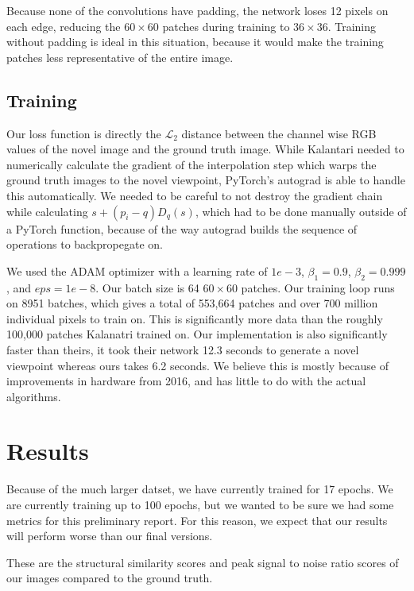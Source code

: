 \documentclass[10pt,twocolumn,letterpaper]{article}
\begin{document}
Because none of the convolutions have padding, the network loses 12 pixels on each edge, reducing
the $60 \times 60$ patches during training to $36 \times 36$. Training without padding is ideal in this situation, 
because it would make the training patches less representative of the entire image.

\subsection{Training}

Our loss function is directly the $\mathcal{L}_2$ distance between the channel wise RGB values of the novel image
and the ground truth image. While Kalantari \etal needed to numerically calculate the gradient of the interpolation
step which warps the ground truth images to the novel viewpoint, PyTorch's autograd is able to handle this automatically.
We needed to be careful to not destroy the gradient chain while calculating $s + \left(p_i - q\right) D_q(s)$, which had
to be done manually outside of a PyTorch function, because of the way autograd builds the sequence of operations to backpropegate on.

We used the ADAM optimizer with a learning rate of $1e-3$, $\beta_1 = 0.9$, $\beta_2 = 0.999$, and $eps = 1e-8$. Our batch size 
is 64 $60 \times 60$ patches. Our training loop runs on 8951 batches, which gives a total of 553,664 patches and over 700 million
individual pixels to train on. This is significantly more data than the roughly 100,000 patches Kalanatri \etal trained on.
Our implementation is also significantly faster than theirs, it took their network 12.3 seconds to generate a novel viewpoint
whereas ours takes 6.2 seconds. We believe this is mostly because of improvements in hardware from 2016, and has little to do with the
actual algorithms.

\section{Results}

Because of the much larger datset, we have currently trained for 17 epochs. We are currently training up to 100 epochs, but we 
wanted to be sure we had some metrics for this preliminary report. For this reason, we expect that our results will perform worse
than our final versions. 

These are the structural similarity scores and peak signal to noise ratio scores of our images compared to the ground truth.
\end{document}
